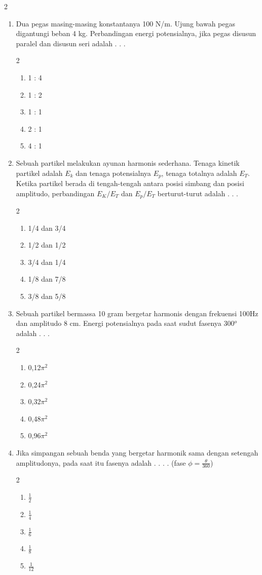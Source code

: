 \documentclass[10pt,a4paper]{extarticle}
\newcommand{\pilgani}[1]{                            \vspace{-0.3cm}\begin{multicols}{2}
 \begin{enumerate}[label=\Alph*., itemsep=0pt,topsep=0pt,leftmargin=*,align=Center]#1                     \end{enumerate}
 \phantom{ini cuma sapi, wedus, dan ayam}
 \end{multicols}}
\begin{document}
\begin{multicols*}{2}
\begin{enumerate}
\item Dua pegas masing-masing konstantanya 100 N/m. Ujung bawah pegas digantungi beban 4 kg. Perbandingan energi potensialnya, jika pegas disusun paralel dan disusun seri adalah . . .
\pilgani{
   \item 1 : 4
   \item 1 :  2
   \item 1 : 1
   \item 2 : 1
   \item 4 : 1
}
\vspace{3cm}

\item Sebuah partikel melakukan ayunan harmonis sederhana. Tenaga kinetik partikel adalah $E_k$ dan tenaga potensialnya $E_p$, tenaga totalnya adalah $E_T$. Ketika partikel berada di tengah-tengah antara posisi simbang dan posisi amplitudo, perbandingan $E_K/E_T$ dan $E_p/E_T$ berturut-turut adalah . . .
\pilgani{
   \item 1/4 dan 3/4
   \item 1/2 dan 1/2
   \item 3/4 dan 1/4
   \item 1/8 dan 7/8
   \item 3/8 dan 5/8
}
\vspace{3cm}

\item Sebuah partikel bermassa 10 gram bergetar harmonis dengan frekuensi 100Hz dan amplitudo 8 cm. Energi potensialnya pada saat sudut fasenya 300$^o$ adalah . . . 
\pilgani{
   \item 0,12$\pi^2$
   \item 0,24$\pi^2$
   \item 0,32$\pi^2$
   \item 0,48$\pi^2$
   \item 0,96$\pi^2$}
\vspace{3cm}

\item Jika simpangan sebuah benda yang bergetar harmonik sama dengan setengah amplitudonya, pada saat itu fasenya adalah  . . . .  (fase $\phi=\frac{\theta}{360}$)
\pilgani{
   \item $\frac{1}{2}$
   \item $\frac{1}{4}$
   \item $\frac{1}{6}$
   \item $\frac{1}{8}$
   \item $\frac{1}{12}$}
   \vspace{3cm}


\end{enumerate}
\end{multicols*}
\end{document}
